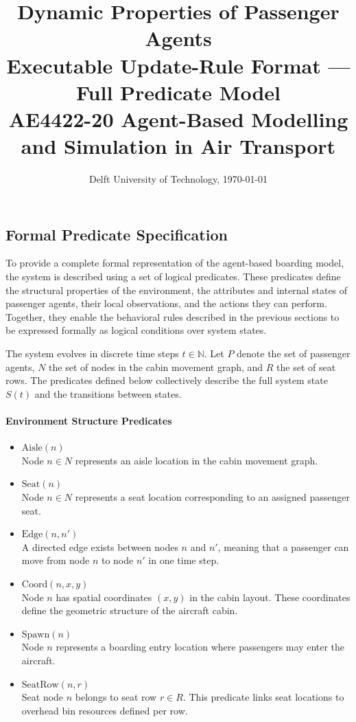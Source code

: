 \documentclass[11pt,a4paper]{article}
\title{\textbf{Dynamic Properties of Passenger Agents}\\
  \large Executable Update-Rule Format --- Full Predicate Model\\[0.5em]
  \normalsize AE4422-20 Agent-Based Modelling and Simulation in Air Transport}
\date{Delft University of Technology, \today}
\begin{document}
\maketitle
\tableofcontents
\listoftodos
\newpage

\subsection*{Formal Predicate Specification}

To provide a complete formal representation of the agent-based boarding model, the system is described using a set of logical predicates. These predicates define the structural properties of the environment, the attributes and internal states of passenger agents, their local observations, and the actions they can perform. Together, they enable the behavioral rules described in the previous sections to be expressed formally as logical conditions over system states.

The system evolves in discrete time steps $t \in \mathbb{N}$. Let $P$ denote the set of passenger agents, $N$ the set of nodes in the cabin movement graph, and $R$ the set of seat rows. The predicates defined below collectively describe the full system state $S(t)$ and the transitions between states.

\paragraph{Environment Structure Predicates}

\begin{itemize}

\item $\text{Aisle}(n)$\\
Node $n \in N$ represents an aisle location in the cabin movement graph.

\item $\text{Seat}(n)$\\
Node $n \in N$ represents a seat location corresponding to an assigned passenger seat.

\item $\text{Edge}(n,n')$\\
A directed edge exists between nodes $n$ and $n'$, meaning that a passenger can move from node $n$ to node $n'$ in one time step.

\item $\text{Coord}(n,x,y)$\\
Node $n$ has spatial coordinates $(x,y)$ in the cabin layout. These coordinates define the geometric structure of the aircraft cabin.

\item $\text{Spawn}(n)$\\
Node $n$ represents a boarding entry location where passengers may enter the aircraft.

\item $\text{SeatRow}(n,r)$\\
Seat node $n$ belongs to seat row $r \in R$. This predicate links seat locations to overhead bin resources defined per row.

\end{itemize}
\end{document}
